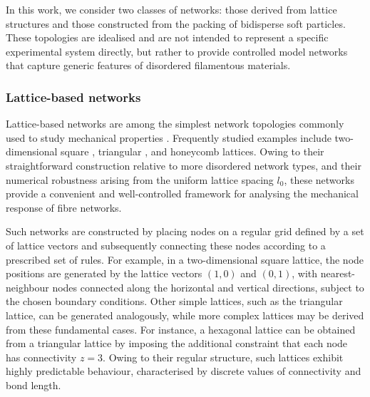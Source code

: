 \documentclass[asymmetricmargins]{library/duthesis}%
\begin{document}
In this work, we consider two classes of networks: those derived from lattice structures and those constructed from the packing of bidisperse soft particles. These topologies are idealised and are not intended to represent a specific experimental system directly, but rather to provide controlled model networks that capture generic features of disordered filamentous materials.

\subsubsection{Lattice-based networks} \label{sec:LatticeBasedNetworks}

Lattice-based networks are among the simplest network topologies commonly used to study mechanical properties \cite{jacobs_generic_1995,feng_percolation_1984,shivers_scaling_2019,sharma_strain-controlled_2016}. Frequently studied examples include two-dimensional square \cite{mao_soft_2010}, triangular \cite{broedersz_criticality_2011,feng_percolation_1984}, and honeycomb \cite{rens_nonlinear_2016} lattices. Owing to their straightforward construction relative to more disordered network types, and their numerical robustness arising from the uniform lattice spacing $l_0$, these networks provide a convenient and well-controlled framework for analysing the mechanical response of fibre networks.

Such networks are constructed by placing nodes on a regular grid defined by a set of lattice vectors and subsequently connecting these nodes according to a prescribed set of rules. For example, in a two-dimensional square lattice, the node positions are generated by the lattice vectors $(1,0)$ and $(0,1)$, with nearest-neighbour nodes connected along the horizontal and vertical directions, subject to the chosen boundary conditions. Other simple lattices, such as the triangular lattice, can be generated analogously, while more complex lattices may be derived from these fundamental cases. For instance, a hexagonal lattice can be obtained from a triangular lattice by imposing the additional constraint that each node has connectivity $z = 3$. Owing to their regular structure, such lattices exhibit highly predictable behaviour, characterised by discrete values of connectivity and bond length.
\end{document}

